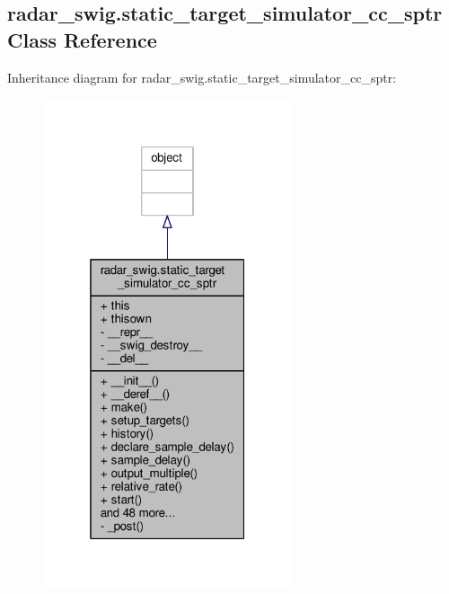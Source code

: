 \subsection{radar\+\_\+swig.\+static\+\_\+target\+\_\+simulator\+\_\+cc\+\_\+sptr Class Reference}
\label{classradar__swig_1_1static__target__simulator__cc__sptr}


Inheritance diagram for radar\+\_\+swig.\+static\+\_\+target\+\_\+simulator\+\_\+cc\+\_\+sptr\+:
\nopagebreak
\begin{figure}[H]
\begin{center}
\leavevmode
\includegraphics[width=208pt]{d5/d52/classradar__swig_1_1static__target__simulator__cc__sptr__inherit__graph}
\end{center}
\end{figure}


